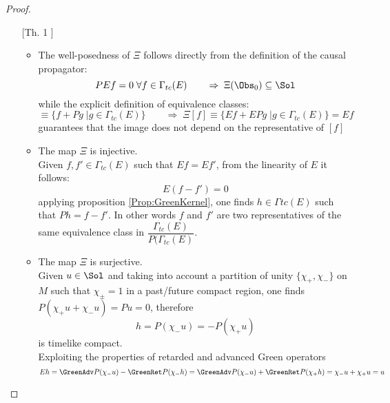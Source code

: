 \documentclass[Main]{subfiles}
\begin{document}
	\begin{proof}
		\forcenewline
		\begin{itemize}
			\item[	[Th. 1]]
				\begin{itemize}
					\item The well-posedness of $\Xi$ follows directly from the definition of the causal propagator:
						\begin{displaymath}
							P E f = 0 \; \forall f \in \Gamma_{tc}(E) \qquad \Rightarrow \; \Xi ( \Obs_0) \subseteq \Sol
						\end{displaymath}
						while the explicit definition of equivalence classes:
						\begin{displaymath}
							[f] \equiv \{ f + P g \; \vert g \in \Gamma_{tc}(E)\} \qquad\Rightarrow \;
							 \Xi [f] \equiv \{ E f + E P g \;\vert g \in \Gamma_{tc}(E)\} = E f
						\end{displaymath}
						guarantees that the image does not depend on the representative of $[f]$
					\item %
						The map $\Xi$ is injective.\\
						Given $f , f' \in \Gamma_{tc}(E)$ such that $E f = E f'$, from the linearity of $E$ it follows:
						\begin{displaymath}
							E ( f - f') = 0
						\end{displaymath}
						applying proposition \ref{Prop:GreenKernel}, one finds $h \in \Gamma{tc}(E)$ such that $P h = f - f'$.
						In other words $f$ and $f'$  are two representatives of the same equivalence class in $\dfrac{\Gamma_{tc}(E)}{P ( \Gamma_{tc}(E)} $.
					\item The map $\Xi$ is surjective.\\
						Given $u \in \Sol$ and taking into account a partition of unity $\{\chi_+, \chi_-\}$ on $M$ such that $\chi_\pm = 1$ in a past/future compact region, one finds $P ( \chi_+ u +  \chi_- u ) = P u=0$, therefore
						\begin{displaymath}
							h = P(\chi_-u) = - P(\chi_+ u)
						\end{displaymath}
						is timelike compact.\\
						Exploiting the properties of retarded and advanced Green operators
						\begin{displaymath}
							E h = \GreenAdv P (\chi_- u ) - \GreenRet P (\chi_- h ) =
							\GreenAdv P (\chi_- u ) + \GreenRet P (\chi_+ h ) = \chi_-u + \chi_+ u = u
						\end{displaymath}

\end{itemize}
\end{itemize}
\end{proof}
\end{document}
